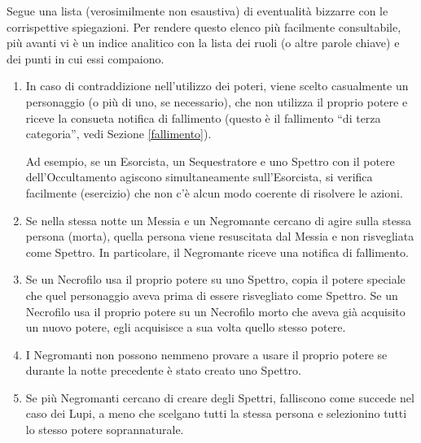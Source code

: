 \documentclass[a4paper,10pt]{article}
\begin{document}
Segue una lista (verosimilmente non esaustiva) di eventualità bizzarre con le corrispettive spiegazioni.
Per rendere questo elenco più facilmente consultabile, più avanti vi è un indice analitico con la lista dei ruoli (o altre parole chiave) e dei punti in cui essi compaiono.

\begin{enumerate}
 
 \item In caso di contraddizione nell'utilizzo dei poteri, viene scelto casualmente un personaggio (o più di uno, se necessario), che non utilizza il proprio potere e riceve la consueta notifica di fallimento (questo è il fallimento ``di terza categoria'', vedi Sezione \ref{fallimento}).
 
 Ad esempio, se un Esorcista, un Sequestratore e uno Spettro con il potere dell'Occultamento agiscono simultaneamente sull'Esorcista, si verifica facilmente (esercizio) che non c'è alcun modo coerente di risolvere le azioni.
 
 \item Se nella stessa notte un Messia e un Negromante cercano di agire sulla stessa persona (morta), quella persona viene resuscitata dal Messia e non risvegliata come Spettro. In particolare, il Negromante riceve una notifica di fallimento.

 \item Se un Necrofilo usa il proprio potere su uno Spettro, copia il potere speciale che quel personaggio aveva prima di essere risvegliato come Spettro.
 Se un Necrofilo usa il proprio potere su un Necrofilo morto che aveva già acquisito un nuovo potere, egli acquisisce a sua volta quello stesso potere.
 
 \item I Negromanti non possono nemmeno provare a usare il proprio potere se durante la notte precedente è stato creato uno Spettro.
 
 \item Se più Negromanti cercano di creare degli Spettri, falliscono come succede nel caso dei Lupi, a meno che scelgano tutti la stessa persona e selezionino tutti lo stesso potere soprannaturale.


\end{enumerate}
\end{document}
